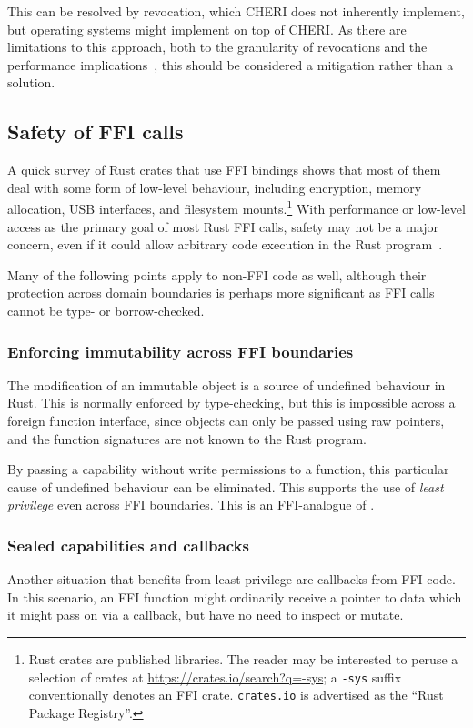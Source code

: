 \documentclass[dissertation.tex]{subfiles}
\begin{document}
This can be resolved by revocation, which CHERI does not inherently
implement, but operating systems might implement on top of CHERI.
As there are limitations to this approach, both to the granularity of
revocations and the performance implications~\cite{cheri-v6}, this
should be considered a mitigation rather than a solution.


\subsection{Safety of FFI calls}
\label{sec:eval-rust-xprocess}

A quick survey of Rust crates that use FFI bindings shows that most of
them deal with some form of low-level behaviour, including encryption,
memory allocation, USB interfaces, and filesystem mounts.\footnote{
    Rust crates are published libraries.
    The reader may be interested to peruse a selection of crates at
    \url{https://crates.io/search?q=-sys};
    a \texttt{-sys} suffix conventionally denotes an FFI crate.
    \texttt{crates.io} is advertised as the ``Rust Package Registry''.
}
With performance or low-level access as the primary goal of most Rust
FFI calls, safety may not be a major concern, even if it could allow
arbitrary code execution in the Rust
program~\cite{szekeres-eternal-war}.

Many of the following points apply to non-FFI code as well, although
their protection across domain boundaries is perhaps more significant as
FFI calls cannot be type- or borrow-checked.

\subsubsection{Enforcing immutability across FFI boundaries}
The modification of an immutable object is a source of undefined
behaviour in Rust.
This is normally enforced by type-checking, but this is impossible
across a foreign function interface, since objects can only be passed
using raw pointers, and the function signatures are not known to the
Rust program.

By passing a capability without write permissions to a function, this
particular cause of undefined behaviour can be eliminated.
This supports the use of \emph{least privilege} even across FFI
boundaries.
This is an FFI-analogue of .

\subsubsection{Sealed capabilities and callbacks}
Another situation that benefits from least privilege are callbacks from
FFI code.
In this scenario, an FFI function might ordinarily receive a pointer to
data which it might pass on via a callback, but have no need to inspect
or mutate.
\end{document}
